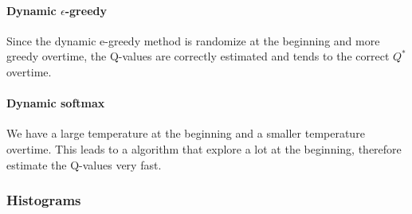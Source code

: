 \documentclass[letterpaper]{article}
\begin{document}
\paragraph{Dynamic $\epsilon$-greedy}

Since the dynamic e-greedy method is randomize at the beginning and
more greedy overtime, the Q-values are correctly estimated and tends to
the correct $Q^*$ overtime.

\paragraph{Dynamic softmax}

We have a large temperature at the beginning and a smaller temperature overtime.
This leads to a algorithm that explore a lot at the beginning, therefore
estimate the Q-values very fast.

\subsubsection{Histograms}
\end{document}
